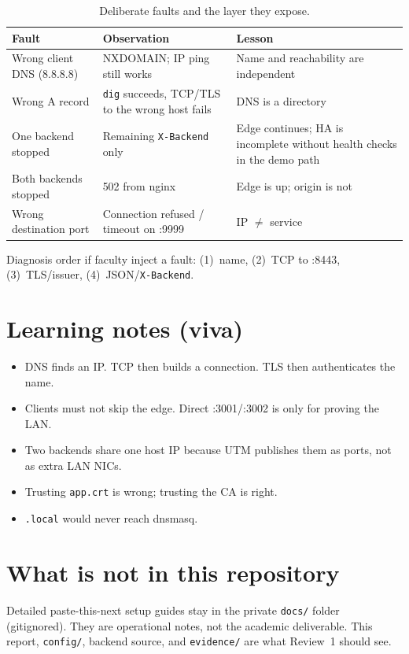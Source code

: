 \documentclass[11pt,a4paper]{article}
\begin{document}
\begin{table}[h]
\centering
\caption{Deliberate faults and the layer they expose.}
{\small
\begin{tabular}{@{}p{3.4cm}p{5.4cm}p{5.4cm}@{}}
\toprule
\textbf{Fault} & \textbf{Observation} & \textbf{Lesson} \\
\midrule
Wrong client DNS (8.8.8.8) & NXDOMAIN; IP ping still works & Name and reachability are independent \\
Wrong A record & \texttt{dig} succeeds, TCP/TLS to the wrong host fails & DNS is a directory \\
One backend stopped & Remaining \texttt{X-Backend} only & Edge continues; HA is incomplete without health checks in the demo path \\
Both backends stopped & 502 from nginx & Edge is up; origin is not \\
Wrong destination port & Connection refused / timeout on :9999 & IP $\neq$ service \\
\bottomrule
\end{tabular}}
\end{table}

Diagnosis order if faculty inject a fault: (1)~name, (2)~TCP to :8443,
(3)~TLS/issuer, (4)~JSON/\texttt{X-Backend}.

\section{Learning notes (viva)}
\begin{itemize}
  \item DNS finds an IP. TCP then builds a connection. TLS then authenticates the name.
  \item Clients must not skip the edge. Direct :3001/:3002 is only for proving the LAN.
  \item Two backends share one host IP because UTM publishes them as ports, not as extra LAN NICs.
  \item Trusting \texttt{app.crt} is wrong; trusting the CA is right.
  \item \texttt{.local} would never reach dnsmasq.
\end{itemize}

\section{What is not in this repository}
Detailed paste-this-next setup guides stay in the private \texttt{docs/} folder (gitignored).
They are operational notes, not the academic deliverable. This report, \texttt{config/},
backend source, and \texttt{evidence/} are what Review~1 should see.
\end{document}
